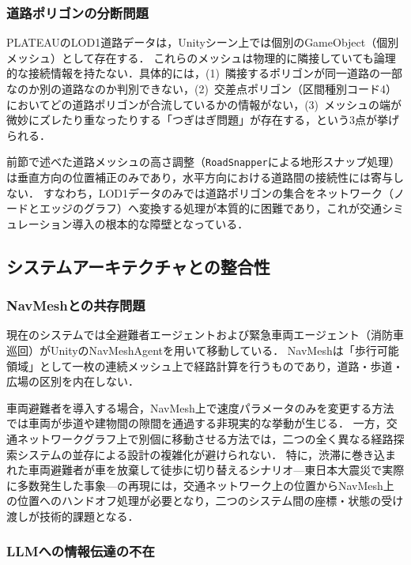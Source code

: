 \documentclass[a4paper,11pt]{jsarticle}
\begin{document}
\subsubsection{道路ポリゴンの分断問題}

PLATEAUのLOD1道路データは，Unityシーン上では個別のGameObject（個別メッシュ）として存在する．
これらのメッシュは物理的に隣接していても論理的な接続情報を持たない．具体的には，(1)~隣接するポリゴンが同一道路の一部なのか別の道路なのか判別できない，(2)~交差点ポリゴン（区間種別コード4）においてどの道路ポリゴンが合流しているかの情報がない，(3)~メッシュの端が微妙にズレたり重なったりする「つぎはぎ問題」が存在する，という3点が挙げられる．

前節で述べた道路メッシュの高さ調整（\texttt{RoadSnapper}による地形スナップ処理）は垂直方向の位置補正のみであり，水平方向における道路間の接続性には寄与しない．
すなわち，LOD1データのみでは道路ポリゴンの集合をネットワーク（ノードとエッジのグラフ）へ変換する処理が本質的に困難であり，これが交通シミュレーション導入の根本的な障壁となっている．

\subsection{システムアーキテクチャとの整合性}

\subsubsection{NavMeshとの共存問題}

現在のシステムでは全避難者エージェントおよび緊急車両エージェント（消防車巡回）がUnityのNavMeshAgentを用いて移動している．
NavMeshは「歩行可能領域」として一枚の連続メッシュ上で経路計算を行うものであり，道路・歩道・広場の区別を内在しない．

車両避難者を導入する場合，NavMesh上で速度パラメータのみを変更する方法では車両が歩道や建物間の隙間を通過する非現実的な挙動が生じる．
一方，交通ネットワークグラフ上で別個に移動させる方法では，二つの全く異なる経路探索システムの並存による設計の複雑化が避けられない．
特に，渋滞に巻き込まれた車両避難者が車を放棄して徒歩に切り替えるシナリオ---東日本大震災で実際に多数発生した事象\cite{evacuationsurvey}---の再現には，交通ネットワーク上の位置からNavMesh上の位置へのハンドオフ処理が必要となり，二つのシステム間の座標・状態の受け渡しが技術的課題となる．

\subsubsection{LLMへの情報伝達の不在}
\end{document}
